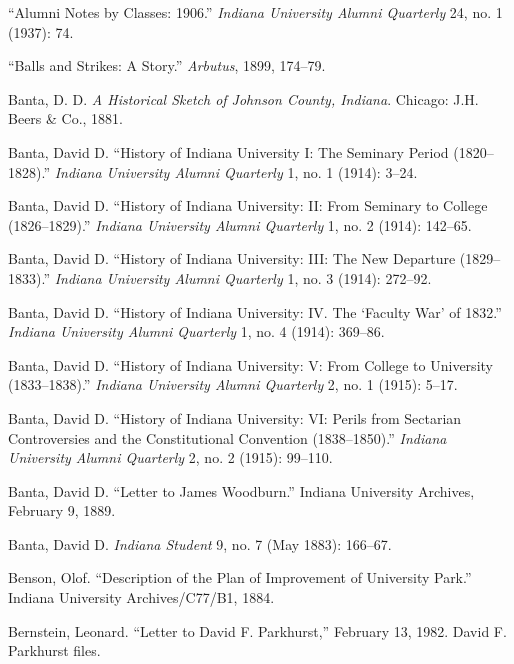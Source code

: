 \documentclass[
  american,
  letterpaper,
]{scrreprt}
\newlength{\cslhangindent}
\newenvironment{CSLReferences}[2] %
 {\begin{list}{}{%
  \setlength{\itemindent}{0pt}
  \setlength{\leftmargin}{0pt}
  \setlength{\parsep}{0pt}
  \ifodd #1
   \setlength{\leftmargin}{\cslhangindent}
   \setlength{\itemindent}{-1\cslhangindent}
  \fi
  \setlength{\itemsep}{#2\baselineskip}}}
 {\end{list}}
\begin{document}
\begin{CSLReferences}{1}{0}
{``Alumni Notes by Classes: 1906.''} \emph{Indiana University Alumni
Quarterly} 24, no. 1 (1937): 74.

{``Balls and Strikes: A Story.''} \emph{Arbutus}, 1899, 174--79.

Banta, D. D. \emph{A Historical Sketch of Johnson County, Indiana}.
Chicago: J.H. Beers \& Co., 1881.

Banta, David D. {``History of Indiana University {I}: The Seminary
Period (1820--1828).''} \emph{Indiana University Alumni Quarterly} 1,
no. 1 (1914): 3--24.

Banta, David D. {``History of Indiana University: II: From Seminary to
College (1826--1829).''} \emph{Indiana University Alumni Quarterly} 1,
no. 2 (1914): 142--65.

Banta, David D. {``History of Indiana University: III: The New Departure
(1829--1833).''} \emph{Indiana University Alumni Quarterly} 1, no. 3
(1914): 272--92.

Banta, David D. {``History of Indiana University: IV. The {`Faculty
War'} of 1832.''} \emph{Indiana University Alumni Quarterly} 1, no. 4
(1914): 369--86.

Banta, David D. {``History of Indiana University: V: From College to
University (1833--1838).''} \emph{Indiana University Alumni Quarterly}
2, no. 1 (1915): 5--17.

Banta, David D. {``History of Indiana University: VI: Perils from
Sectarian Controversies and the Constitutional Convention
(1838--1850).''} \emph{Indiana University Alumni Quarterly} 2, no. 2
(1915): 99--110.

Banta, David D. {``Letter to James Woodburn.''} Indiana University
Archives, February 9, 1889.

Banta, David D. \emph{Indiana Student} 9, no. 7 (May 1883): 166--67.

Benson, Olof. {``Description of the Plan of Improvement of University
Park.''} Indiana University Archives/C77/B1, 1884.

Bernstein, Leonard. {``Letter to David {F.} Parkhurst,''} February 13,
1982. David F. Parkhurst files.


\end{CSLReferences}
\end{document}
